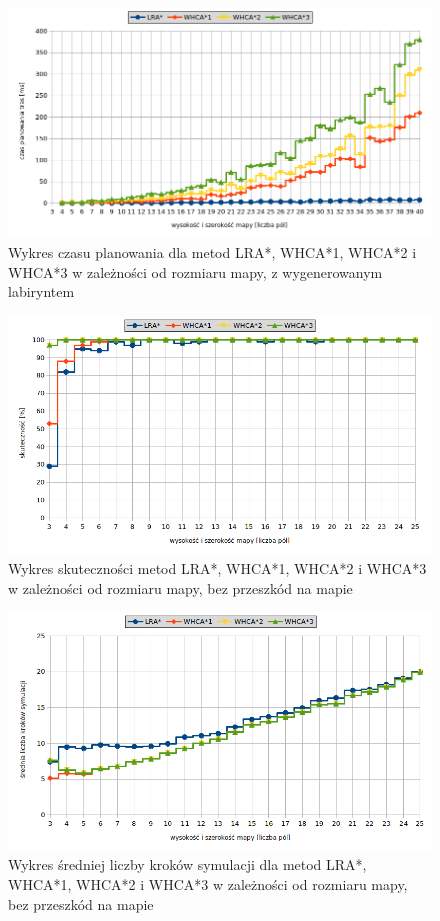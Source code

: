 \begin{figure}
	\centering
	\includegraphics[width=0.8\columnwidth]{img/plots/test-steps-maze-mapsize-calctime}
	\caption{Wykres czasu planowania dla metod LRA*, WHCA*1, WHCA*2 i WHCA*3 w zależności od rozmiaru mapy, z wygenerowanym labiryntem}
	\label{fig:test-steps-maze-mapsize-calctime}
\end{figure}
\begin{figure}
	\centering
	\includegraphics[width=0.8\columnwidth]{img/plots/test-steps-empty-mapsize-eff}
	\caption{Wykres skuteczności metod LRA*, WHCA*1, WHCA*2 i WHCA*3 w zależności od rozmiaru mapy, bez przeszkód na mapie}
	\label{fig:test-steps-empty-mapsize-eff}
\end{figure}
\begin{figure}
	\centering
	\includegraphics[width=0.8\columnwidth]{img/plots/test-steps-empty-mapsize-steps}
	\caption{Wykres średniej liczby kroków symulacji dla metod LRA*, WHCA*1, WHCA*2 i WHCA*3 w zależności od rozmiaru mapy, bez przeszkód na mapie}
	\label{fig:test-steps-empty-mapsize-steps}
\end{figure}
